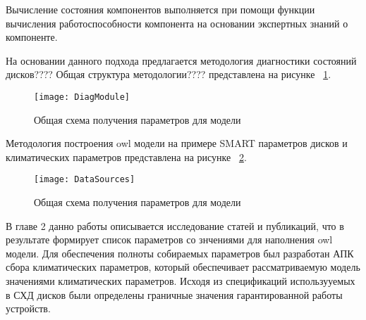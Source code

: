 Вычисление  состояния  компонентов  выполняется  при  помощи функции вычисления работоспособности компонента на основании экспертных знаний о компоненте.

На основании данного подхода предлагается методология диагностики состояний дисков????
Общая структура методологии???? представлена на рисунке ~\ref{fig:DiagModule}.
\begin{figure}[h]
	\centering
	\texttt{[image: DiagModule]}
	\caption{Общая схема получения параметров для модели}
	\label{fig:DiagModule}
\end{figure}

Методология построения owl модели на примере SMART параметров дисков и климатических параметров представлена на рисунке ~\ref{fig:DataSources}.

\begin{figure}[h]
	\centering
	\texttt{[image: DataSources]}
	\caption{Общая схема получения параметров для модели}
	\label{fig:DataSources}
\end{figure}

В главе 2 данно работы описывается исследование статей и публикаций, что в результате формирует список параметров со знчениями для наполнения owl модели. Для обеспечения полноты собираемых параметров был разработан АПК сбора климатических параметров, который обеспечивает рассматриваемую модель значениями климатических параметров. Исходя из спецификаций использууемых в СХД дисков были определены граничные значения гарантированной работы устройств. 
